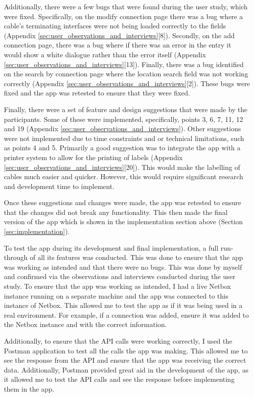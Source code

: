 \documentclass [11pt,a4paper]{article}
\begin{document}
Additionally, there were a few bugs that were found during the user study, which were fixed. Specifically, on the modify connection page there was a bug where a cable's terminating interfaces were not being loaded correctly to the fields (Appendix \ref{sec:user_observations_and_interviews}[8]). Secondly, on the add connection page, there was a bug where if there was an error in the entry it would show a white dialogue rather than the error itself (Appendix \ref{sec:user_observations_and_interviews}[13]). Finally, there was a bug identified on the search by connection page where the location search field was not working correctly (Appendix \ref{sec:user_observations_and_interviews}[2]). These bugs were fixed and the app was retested to ensure that they were fixed.

\pagebreak

Finally, there were a set of feature and design suggestions that were made by the participants. Some of these were implemented, specifically, points 3, 6, 7, 11, 12 and 19 (Appendix \ref{sec:user_observations_and_interviews}). Other suggestions were not implemented due to time constraints and or technical limitations, such as points 4 and 5. Primarily a good suggestion was to integrate the app with a printer system to allow for the printing of labels (Appendix \ref{sec:user_observations_and_interviews}[20]). This would make the labelling of cables much easier and quicker. However, this would require significant research and development time to implement.

Once these suggestions and changes were made, the app was retested to ensure that the changes did not break any functionality. This then made the final version of the app which is shown in the implementation section above (Section \ref{sec:implementation}).

To test the app during its development and final implementation, a full run-through of all its features was conducted. This was done to ensure that the app was working as intended and that there were no bugs. This was done by myself and confirmed via the observations and interviews conducted during the user study. To ensure that the app was working as intended, I had a live Netbox instance running on a separate machine and the app was connected to this instance of Netbox. This allowed me to test the app as if it was being used in a real environment. For example, if a connection was added, ensure it was added to the Netbox instance and with the correct information. 

Additionally, to ensure that the API calls were working correctly, I used the Postman application to test all the calls the app was making. This allowed me to see the response from the API and ensure that the app was receiving the correct data. Additionally, Postman provided great aid in the development of the app, as it allowed me to test the API calls and see the response before implementing them in the app.
\end{document}
